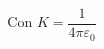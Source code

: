 \documentclass[preview]{standalone}
\begin{document}
\begin{align*}
\text{Con } K = \dfrac{1}{4 \pi \varepsilon_0}
\end{align*}
\end{document}
